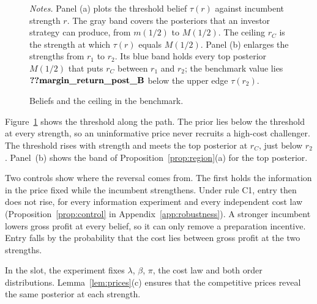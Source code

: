 \begin{figure}[tbp]
\centering
{}
\caption{Beliefs and the ceiling in the benchmark.}\label{fig:beliefs}
\par\medskip
\begin{minipage}{\linewidth}\footnotesize\singlespacing
\textit{Notes.} Panel (a) plots the threshold belief \(\tau(r)\) against incumbent strength \(r\). The gray band
covers the posteriors that an investor strategy can produce, from \(m(1/2)\) to \(M(1/2)\). The ceiling \(r_C\) is the
strength at which \(\tau(r)\) equals \(M(1/2)\). Panel (b) enlarges the strengths from \(r_1\) to \(r_2\). Its blue band
holds every top posterior \(M(1/2)\) that puts \(r_C\) between \(r_1\) and \(r_2\); the benchmark value lies
\(\reg{margin_return_post_B}\) below the upper edge \(\tau(r_2)\).
\end{minipage}
\end{figure}

Figure~\ref{fig:beliefs} shows the threshold along the path. The prior lies below the threshold at every strength,
so an uninformative price never recruits a high-cost challenger. The threshold rises with strength and meets the top
posterior at \(r_C\), just below \(r_2\). Panel~(b) shows the band of Proposition~\ref{prop:region}(a) for the top
posterior.

Two controls show where the reversal comes from. The first holds the information in the price fixed while the
incumbent strengthens. Under rule C1, entry then does not rise, for every information experiment and every
independent cost law (Proposition~\ref{prop:control} in Appendix~\ref{app:robustness}). A stronger incumbent lowers gross profit at every
belief, so it can only remove a preparation incentive. Entry falls by the probability that the cost lies between gross
profit at the two strengths.

In the slot, the experiment fixes \(\lambda\), \(\beta\), \(\pi\), the cost law and both
order distributions. Lemma~\ref{lem:prices}(c) ensures that the competitive prices reveal the same posterior at each
strength.

